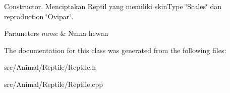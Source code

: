 Constructor. Menciptakan Reptil yang memiliki skin\+Type \char`\"{}\+Scales\char`\"{} dan reproduction \char`\"{}\+Ovipar\char`\"{}. 


\begin{DoxyParams}{Parameters}
{\em name} & Nama hewan \\
\hline
\end{DoxyParams}


The documentation for this class was generated from the following files\+:\begin{DoxyCompactItemize}
\item 
src/\+Animal/\+Reptile/Reptile.\+h\item 
src/\+Animal/\+Reptile/Reptile.\+cpp\end{DoxyCompactItemize}
